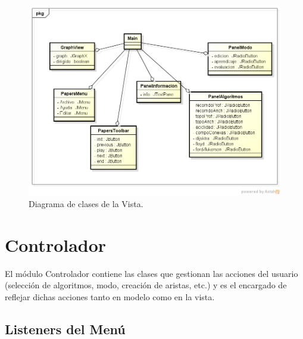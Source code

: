 \documentclass{book}
\begin{document}
\begin{figure}[H]
	\centering
	\includegraphics[width=1\textwidth]{images/vista.png}
	\medskip
	\caption{Diagrama de clases de la Vista.}
	\medskip
\end{figure}
\bigskip

\newpage
\section{Controlador}

El módulo Controlador contiene las clases que gestionan las acciones del usuario (selección de algoritmos, modo, creación de aristas, etc.) y es el encargado de reflejar dichas acciones tanto en modelo como en la vista.
\medskip

\subsection{Listeners del Menú}
\end{document}
